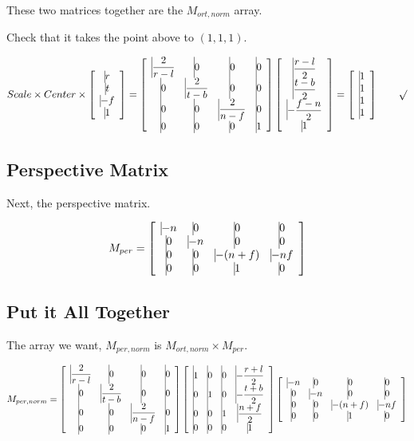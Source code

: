 \documentclass[11pt]{article}
\begin{document}
\begin{spacing}{1.2}
These two matrices together are the $M_{ort,norm}$ array.  

Check that it takes the point above to $(1,1,1)$.  

$$
Scale \times Center \times  
\left[
	\begin{array}{*4{>{\displaystyle\vrule width 0pt height 16pt depth 12pt}c}}
		r \cr t \cr -f \cr 1 \cr
	\end{array}
\right]
=
\left[
	\begin{array}{*4{>{\displaystyle\vrule width 0pt height 16pt depth 12pt}c}}
		\frac{2}{r-l} & 0 & 0 & 0 \cr
		0 & \frac{2}{t-b} & 0 & 0 \cr
		0 & 0 & \frac{2}{n-f} & 0 \cr
		0 & 0 & 0 & 1 \cr
	\end{array}
\right]
\left[
	\begin{array}{*4{>{\displaystyle\vrule width 0pt height 16pt depth 12pt}c}}
		\frac{r-l}{2} \cr
		\frac{t-b}{2} \cr
		- \frac{f-n}{2} \cr
		1
	\end{array}
\right]
=
\left[
	\begin{array}{*4{>{\displaystyle\vrule width 0pt height 16pt depth 12pt}c}}
		1 \cr 1 \cr 1 \cr 1 \cr
	\end{array}
\right]
\qquad \surd
$$

\subsection{Perspective Matrix}

Next, the perspective matrix.  

$$
M_{per} = 
\left[
	\begin{array}{*4{>{\displaystyle\vrule width 0pt height 16pt depth 12pt}c}}
		-n & 0 & 0 & 0 \cr
		0 & -n & 0 & 0 \cr
		0 & 0 & -(n+f) & -nf \cr
		0 & 0 & 1 & 0 \cr
	\end{array}
\right]
$$

\subsection{Put it All Together}

The array we want, $M_{per,norm}$ is $M_{ort,norm} \times M_{per}$.

$$
M_{per,norm} = 
\left[
	\begin{array}{*4{>{\displaystyle\vrule width 0pt height 16pt depth 12pt}c}}
		\frac{2}{r-l} & 0 & 0 & 0 \cr
		0 & \frac{2}{t-b} & 0 & 0 \cr
		0 & 0 & \frac{2}{n-f} & 0 \cr
		0 & 0 & 0 & 1 \cr
	\end{array}
\right]
\left[
	\begin{array}{*4{>{\displaystyle\vrule width 0pt height 16pt depth 12pt}c}}
		1 & 0 & 0 & -\frac{r+l}{2} \cr
		0 & 1 & 0 & -\frac{t+b}{2} \cr
		0 & 0 & 1 & \frac{n+f}{2} \cr
		0 & 0 & 0 & 1 \cr
	\end{array}
\right]
\left[
	\begin{array}{*4{>{\displaystyle\vrule width 0pt height 16pt depth 12pt}c}}
		-n & 0 & 0 & 0 \cr
		0 & -n & 0 & 0 \cr
		0 & 0 & -(n+f) & -nf \cr
		0 & 0 & 1 & 0 \cr
	\end{array}
\right]
$$


\end{spacing}
\end{document}
